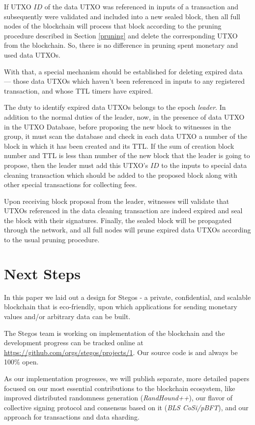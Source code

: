 \documentclass[a4paper, 10pt, conference]{ieeeconf}
\begin{document}
If UTXO $ID$ of the data UTXO was referenced in inputs of a transaction and subsequently were validated and included into a new sealed block, then all full nodes of the blockchain will process that block according to the pruning procedure described in Section \ref{pruning} and delete the corresponding UTXO from the blockchain. So, there is no difference in pruning spent monetary and used data UTXOs.

With that, a special mechanism should be established for deleting expired data --- those data UTXOs which haven't been referenced in inputs to any registered transaction, and whose TTL timers have expired.

The duty to identify expired data UTXOs belongs to the epoch \textit{leader}. In addition to the normal duties of the leader, now, in the presence of data UTXO in the UTXO Database, before proposing the new block to witnesses in the group, it must scan the database and check in each data UTXO a number of the block in which it has been created and its TTL. If the sum of creation block number and TTL is less than number of the new block that the leader is going to propose, then the leader must add this UTXO's $ID$ to the inputs to special data cleaning transaction which should be added to the proposed block along with other special transactions for collecting fees. 

Upon receiving block proposal from the leader, witnesses will validate that UTXOs referenced in the data cleaning transaction are indeed expired and seal the block with their signatures. Finally, the sealed block will be propagated through the network, and all full nodes will prune expired data UTXOs according to the usual pruning procedure.

\section{Next Steps}

In this paper we laid out a design for Stegos - a private, confidential, and scalable blockchain that is eco-friendly, upon which applications for sending monetary values and/or arbitrary data can be built.

The Stegos team is working on implementation of the blockchain and the development progress can be tracked online at \url{https://github.com/orgs/stegos/projects/1}. Our source code is and always be 100\% open.

As our implementation progresses, we will publish separate, more detailed papers focused on our most essential contributions to the blockchain ecosystem, like improved distributed randomness generation (\textit{RandHound++}), our flavor of collective signing protocol and consensus based on it (\textit{BLS CoSi/pBFT}), and our approach for transactions and data sharding. 
\end{document}
